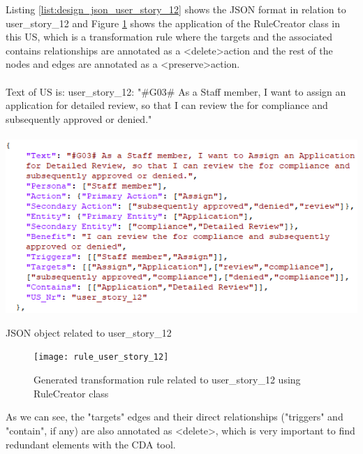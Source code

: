 \begin{example}
	Listing \ref{list:design_json_user_story_12} shows the JSON format in relation to user\_story\_12 and Figure \ref{fig:desing_rule_user_story_12} shows the application of the RuleCreator class in this US, which is a transformation rule where the targets and the associated contains relationships are annotated as a \textless delete\textgreater action and the rest of the nodes and edges are annotated as a \textless preserve\textgreater action.\\\\
	Text of US is:
	user\_story\_12: "\#G03\# As a Staff member, I want to assign an application for detailed review, so that I can review the for compliance and subsequently approved or denied."
	\begin{MyListing}
		\paragraph{}
		\centering
		\includegraphics[scale=0.8]{Listing/json_user_story_12.png}
		\caption{JSON object related to user\_story\_12}\label{list:design_json_user_story_12}
	\end{MyListing}
	\begin{figure}[h]
		\centering
		\texttt{[image: rule\_user\_story\_12]}
		\caption{Generated transformation rule related to user\_story\_12 using RuleCreator class}\label{fig:desing_rule_user_story_12}
	\end{figure}
	As we can see, the "targets" edges and their direct relationships ("triggers" and "contain", if any) are also annotated as \textless delete\textgreater, which is very important to find redundant elements with the CDA tool.
\end{example}

